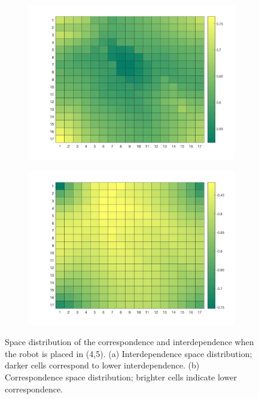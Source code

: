 \begin{figure}[H]
\centering
  \begin{subfigure}[t]{0.49\columnwidth}
  \centering
    \includegraphics[width=\linewidth]{images/06-deception/interdependence.jpg}
    \caption{}
    \label{fig:interdipendence}
  \end{subfigure}
  \begin{subfigure}[t]{0.49\columnwidth}
  \centering
    \includegraphics[width=\linewidth]{images/06-deception/correspondence.jpg}
    \caption{}
    \label{fig:correspondence}
  \end{subfigure}
  \caption{Space distribution of the correspondence and interdependence when the robot is placed in (4,5). (a) Interdependence space distribution; darker cells correspond to lower interdependence. (b) Correspondence space distribution; brighter cells indicate lower correspondence.}
  \label{fig::interdependece}
\end{figure}

